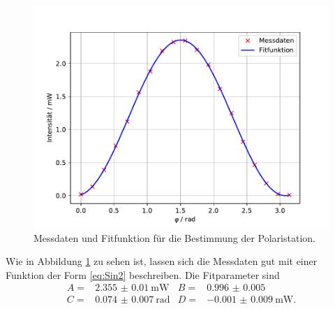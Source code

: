 \FloatBarrier
\begin{figure}
  \centering
  \includegraphics[width= \textwidth, keepaspectratio]{figure/Polarisation.pdf}
  \caption{Messdaten und Fitfunktion für die Bestimmung der Polaristation.}
  \label{fig:Polarisation}
\end{figure}
\FloatBarrier
Wie in Abbildung \ref{fig:Polarisation} zu sehen ist, lassen sich die Messdaten gut mit einer Funktion der Form \eqref{eq:Sin2}
beschreiben.
Die Fitparameter sind 
\begin{align*}
  A=&\SI{2.355(10)}{\milli\watt} &B=&\num{0.996(5)}\\
  C=&\SI{0.074(7)}{\radian} &D=&\SI{-0.001(9)}{\milli\watt}.
\end{align*}
